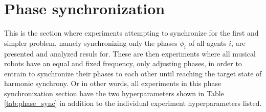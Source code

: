 

	

\section{Phase synchronization}
\label{sec:phase_sync}
This is the section where experiments attempting to synchronize for the first and simpler problem, namely synchronizing only the phases $\phi_i$ of all agents $i$, are presented and analyzed resuls for. These are then experiments where all musical robots have an equal and fixed frequency, only adjusting phases, in order to entrain to synchronize their phases to each other until reaching the target state of harmonic synchrony. Or in other words, all experiments in this phase synchronization section have the two hyperparameters shown in Table \ref{tab:phase_sync} in addition to the individual experiment hyperparameters listed.

